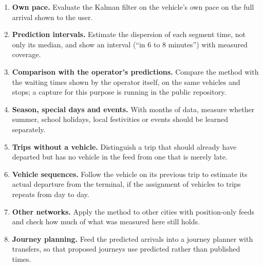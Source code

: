 \begin{enumerate}
  \item \textbf{Own pace.} Evaluate the Kalman filter on the vehicle's own pace on the full arrival shown to the user.
  \item \textbf{Prediction intervals.} Estimate the dispersion of each segment time, not only its median, and show an
        interval (``in 6 to 8 minutes'') with measured coverage.
  \item \textbf{Comparison with the operator's predictions.} Compare the method with the waiting times shown by the
        operator itself, on the same vehicles and stops; a capture for this purpose is running in the public
        repository.
  \item \textbf{Season, special days and events.} With months of data, measure whether summer, school holidays, local
        festivities or events should be learned separately.
  \item \textbf{Trips without a vehicle.} Distinguish a trip that should already have departed but has no vehicle in
        the feed from one that is merely late.
  \item \textbf{Vehicle sequences.} Follow the vehicle on its previous trip to estimate its actual departure from the
        terminal, if the assignment of vehicles to trips repeats from day to day.
  \item \textbf{Other networks.} Apply the method to other cities with position-only feeds and check how much of what
        was measured here still holds.
  \item \textbf{Journey planning.} Feed the predicted arrivals into a journey planner with transfers, so that proposed
        journeys use predicted rather than published times.
\end{enumerate}
